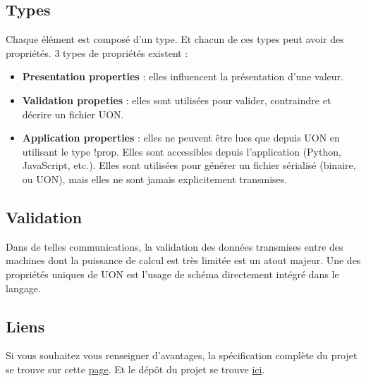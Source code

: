 \documentclass[
    iict, %
    il, %
]{heig-tb}
\begin{document}
\subsection{Types}
Chaque élément est composé d'un type. Et chacun de ces types peut avoir des propriétés.
3 types de propriétés existent :
\begin{itemize}
    \item \textbf{Presentation properties} : elles influencent la présentation d'une valeur.
    \item \textbf{Validation propeties} : elles sont utilisées pour valider, contraindre et décrire un fichier UON.
    \item \textbf{Application properties} : elles ne peuvent être lues que depuis UON en utilisant le type !prop. Elles sont accessibles depuis l'application (Python, JavaScript, etc.). Elles sont utilisées pour générer un fichier sérialisé (binaire, ou UON), mais elles ne sont jamais explicitement transmises.
\end{itemize}

\subsection{Validation}
Dans de telles communications, la validation des données transmises entre des machines dont la puissance de calcul est très limitée est un atout majeur.
Une des propriétés uniques de UON est l'usage de schéma directement intégré dans le langage.


\subsection{Liens}
Si vous souhaitez vous renseigner d'avantages, la spécification complète du projet se trouve sur cette \href{https://github.com/uon-language/specification/}{page}.
Et le dépôt du projet se trouve \href{https://github.com/uon-language/specification}{ici}.



\end{document}
